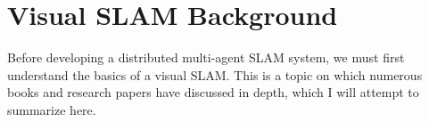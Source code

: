 











\section{Visual SLAM Background}
\label{sec:visual-slam-background}
Before developing a distributed multi-agent SLAM system, we must first understand the basics of a visual SLAM. This is a topic on which numerous books \autocite{gao2021introduction} and research papers \autocite{durrant2006simultaneous} have discussed in depth, which I will attempt to summarize here.

